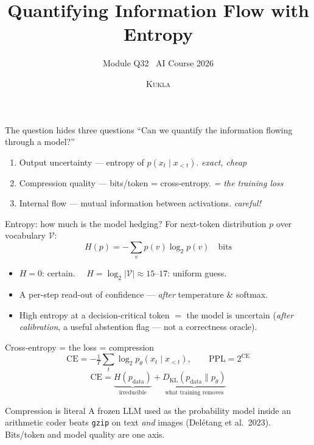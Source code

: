 \documentclass[aspectratio=169,11pt]{beamer}
\title{Quantifying Information Flow with Entropy}
\subtitle{Module Q32 \textendash\ AI Course 2026}
\author{\textsc{Kukla}}
\institute{Anchor: L2.1 \textbullet\ Week 4}
\date{}
\begin{document}
\maketitle

\begin{frame}{The question hides three questions}
``Can we quantify the information flowing through a model?''
\begin{enumerate}
  \item<1-> \alert{Output uncertainty} --- entropy of $p(x_t\mid x_{<t})$.
    \hfill\textit{exact, cheap}
  \item<2-> \alert{Compression quality} --- bits/token = cross-entropy.
    \hfill\textit{= the training loss}
  \item<3-> \alert{Internal flow} --- mutual information between activations.
    \hfill\textit{careful!}
\end{enumerate}
\vspace{1em}
\end{frame}

\begin{frame}{Entropy: how much is the model hedging?}
For next-token distribution $p$ over vocabulary $\mathcal V$:
\[
  H(p) = -\sum_{v} p(v)\log_2 p(v)\quad\text{bits}
\]
\begin{itemize}
  \item $H=0$: certain. $\quad H=\log_2|\mathcal V|\approx 15$--$17$: uniform guess.
  \item A per-step read-out of confidence --- \emph{after} temperature \& softmax.
  \item High entropy at a decision-critical token $=$ the model is uncertain
    (\emph{after calibration}, a useful abstention flag --- not a correctness oracle).
\end{itemize}
\end{frame}

\begin{frame}{Cross-entropy = the loss = compression}
\[
  \mathrm{CE} = -\tfrac{1}{T}\sum_t \log_2 p_\theta(x_t\mid x_{<t}),
  \qquad \mathrm{PPL}=2^{\mathrm{CE}}
\]
\[
  \mathrm{CE} = \underbrace{H(p_{\text{data}})}_{\text{irreducible}}
  + \underbrace{D_{\mathrm{KL}}(p_{\text{data}}\|p_\theta)}_{\text{what training removes}}
\]
\begin{alertblock}{Compression is literal}
A frozen LLM used as the probability model inside an arithmetic coder beats
\texttt{gzip} on text \emph{and} images (Del\'etang et al.\ 2023).
Bits/token and model quality are one axis.
\end{alertblock}
\end{frame}
\end{document}
